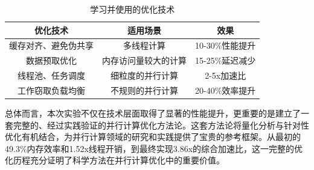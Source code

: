 \documentclass[a4paper]{article}
\begin{document}
\begin{table} 
\centering
\begin{tabular}{ccc}
\toprule
优化技术 & 适用场景 & 效果 \\
\midrule
缓存对齐、避免伪共享 & 多线程计算 & 10-30\%性能提升 \\
数据预取优化 & 内存访问量较大的计算 & 15-25\%延迟减少 \\
线程池、任务调度 & 细粒度的并行计算 & 2-5x加速比 \\
工作窃取负载均衡 & 不规则的并行计算 & 20-40\%效率提升 \\
\bottomrule
\end{tabular}
\caption{学习并使用的优化技术}
\label{t5}
\end{table}

总体而言，本次实验不仅在技术层面取得了显著的性能提升，更重要的是建立了一套完整的、经过实践验证的并行计算优化方法论。这套方法论将量化分析与针对性优化有机结合，为并行计算领域的研究和实践提供了宝贵的参考框架。从最初的49.3\%内存效率和1.52x线程开销，到最终实现3.86x的综合加速比，这一完整的优化历程充分证明了科学方法在并行计算优化中的重要价值。
\end{document}
